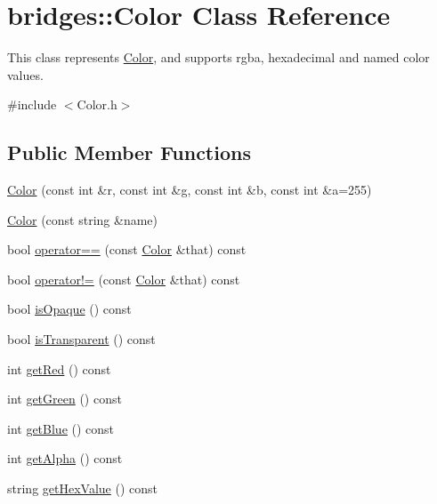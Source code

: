\hypertarget{classbridges_1_1_color}{}\section{bridges\+:\+:Color Class Reference}
\label{classbridges_1_1_color}


This class represents \hyperlink{classbridges_1_1_color}{Color}, and supports rgba, hexadecimal and named color values.  




{\ttfamily \#include $<$Color.\+h$>$}

\subsection*{Public Member Functions}
\begin{DoxyCompactItemize}
\item 
\hyperlink{classbridges_1_1_color_aa861c0dc7729008cc4f886f235198181}{Color} (const int \&r, const int \&g, const int \&b, const int \&a=255)
\item 
\hyperlink{classbridges_1_1_color_a813c6cb59aad0883bcc12305fa6049cc}{Color} (const string \&name)
\item 
bool \hyperlink{classbridges_1_1_color_ab8cf6a7a8a786e2145c9d814f719aa9c}{operator==} (const \hyperlink{classbridges_1_1_color}{Color} \&that) const 
\item 
bool \hyperlink{classbridges_1_1_color_a9d0c6d7f2fc3d875b6af38c0e90d2c4f}{operator!=} (const \hyperlink{classbridges_1_1_color}{Color} \&that) const 
\item 
bool \hyperlink{classbridges_1_1_color_aed2780b4954dccd7a243ee956522f132}{is\+Opaque} () const 
\item 
bool \hyperlink{classbridges_1_1_color_a7575f11baf808823ea5c8e68b5b71a45}{is\+Transparent} () const 
\item 
int \hyperlink{classbridges_1_1_color_a50d72a73bf683426437b6c4dbb7e080b}{get\+Red} () const 
\item 
int \hyperlink{classbridges_1_1_color_a7ee04a0a4a4788d0a8671fb5d46cb4f8}{get\+Green} () const 
\item 
int \hyperlink{classbridges_1_1_color_ad623a08fcd93b60831bdc80acbc30cb6}{get\+Blue} () const 
\item 
int \hyperlink{classbridges_1_1_color_a144062e54bb7f39eca05f0bc2cc66ba3}{get\+Alpha} () const 
\item 
string \hyperlink{classbridges_1_1_color_abdf44b8eb8c79452e38b93c02fb0aa99}{get\+Hex\+Value} () const 

\end{DoxyCompactItemize}
